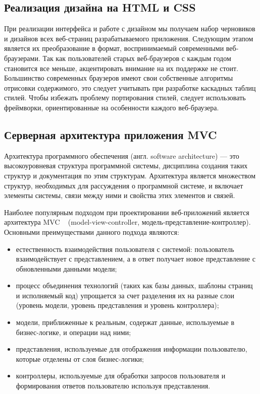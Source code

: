 
\subsection{Реализация дизайна на HTML и CSS}
\label{sub:domain:learning_structure}
При реализации интерфейса и работе с дизайном мы получаем набор черновиков и дизайнов всех веб-страниц разрабатываемого приложения. Следующим этапом является их преобразование в формат, воспринимаемый современными веб-браузерами. Так как пользователей старых веб-браузеров с каждым годом становится все меньше, акцентировать внимание на их поддержке не стоит. Большинство современных браузеров имеют свои собственные алгоритмы отрисовки содержимого, это следует учитывать при разработке каскадных таблиц стилей. Чтобы избежать проблему портирования стилей, следует использовать фреймворки, ориентированные на особенности каждого веб-браузера.


\subsection{Серверная архитектура приложения MVC}
\label{sub:domain:manual_structure}
Архитектура программного обеспечения (англ. software architecture) — это высокоуровневая структура программной системы, дисциплина создания таких структур и документация по этим структурам. Архитектура является множеством структур, необходимых для рассуждения о программной системе, и включает элементы системы, связи между ними и свойства этих элементов и связей.

Наиболее популярным подходом при проектировании веб-приложений является архитектура MVC ~\cite{mvc} (model-view-controller, модель-представление-контроллер). Основными преимуществами данного подхода являются:

\begin{itemize}
  \item естественность взаимодействия пользователя с системой: пользователь взаимодействует с представлением, а в ответ получает новое представление с обновленными данными модели;
  \item процесс объединения технологий (таких как базы данных, шаблоны страниц и исполняемый код) упрощается за счет разделения их на разные слои (уровень модели, уровень представления и уровень контроллера);
  \item модели, приближенные к реальным, содержат данные, используемые в бизнес-логике, и операции над ними;
  \item представления, используемые для отображения информации пользователю, которые отделены от слоя бизнес-логики;
  \item контроллеры, используемые для обработки запросов пользователя и формирования ответов пользователю используя представления.
\end{itemize}

